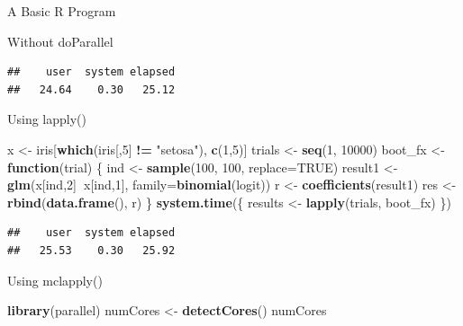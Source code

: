 \documentclass[ignorenonframetext,]{beamer}
\newenvironment{Shaded}{\begin{snugshade}}{\end{snugshade}}
\newcommand{\KeywordTok}[1]{\textcolor[rgb]{0.13,0.29,0.53}{\textbf{#1}}}
\newcommand{\DataTypeTok}[1]{\textcolor[rgb]{0.13,0.29,0.53}{#1}}
\newcommand{\DecValTok}[1]{\textcolor[rgb]{0.00,0.00,0.81}{#1}}
\newcommand{\StringTok}[1]{\textcolor[rgb]{0.31,0.60,0.02}{#1}}
\newcommand{\OtherTok}[1]{\textcolor[rgb]{0.56,0.35,0.01}{#1}}
\newcommand{\ControlFlowTok}[1]{\textcolor[rgb]{0.13,0.29,0.53}{\textbf{#1}}}
\newcommand{\OperatorTok}[1]{\textcolor[rgb]{0.81,0.36,0.00}{\textbf{#1}}}
\newcommand{\NormalTok}[1]{#1}
\begin{document}
\begin{frame}[fragile]{A Basic R Program}
\begin{block}{Without doParallel}
\begin{verbatim}
##    user  system elapsed 
##   24.64    0.30   25.12
\end{verbatim}

\end{block}

\begin{block}{Using lapply()}

\begin{Shaded}
\begin{Highlighting}[]
\NormalTok{x <-}\StringTok{ }\NormalTok{iris[}\KeywordTok{which}\NormalTok{(iris[,}\DecValTok{5}\NormalTok{] }\OperatorTok{!=}\StringTok{ "setosa"}\NormalTok{), }\KeywordTok{c}\NormalTok{(}\DecValTok{1}\NormalTok{,}\DecValTok{5}\NormalTok{)]}
\NormalTok{trials <-}\StringTok{ }\KeywordTok{seq}\NormalTok{(}\DecValTok{1}\NormalTok{, }\DecValTok{10000}\NormalTok{)}
\NormalTok{boot_fx <-}\StringTok{ }\ControlFlowTok{function}\NormalTok{(trial) \{}
\NormalTok{  ind <-}\StringTok{ }\KeywordTok{sample}\NormalTok{(}\DecValTok{100}\NormalTok{, }\DecValTok{100}\NormalTok{, }\DataTypeTok{replace=}\OtherTok{TRUE}\NormalTok{)}
\NormalTok{  result1 <-}\StringTok{ }\KeywordTok{glm}\NormalTok{(x[ind,}\DecValTok{2}\NormalTok{]}\OperatorTok{~}\NormalTok{x[ind,}\DecValTok{1}\NormalTok{], }\DataTypeTok{family=}\KeywordTok{binomial}\NormalTok{(logit))}
\NormalTok{  r <-}\StringTok{ }\KeywordTok{coefficients}\NormalTok{(result1)}
\NormalTok{  res <-}\StringTok{ }\KeywordTok{rbind}\NormalTok{(}\KeywordTok{data.frame}\NormalTok{(), r)}
\NormalTok{\}}
\KeywordTok{system.time}\NormalTok{(\{}
\NormalTok{  results <-}\StringTok{ }\KeywordTok{lapply}\NormalTok{(trials, boot_fx)}
\NormalTok{\})}
\end{Highlighting}
\end{Shaded}

\begin{verbatim}
##    user  system elapsed 
##   25.53    0.30   25.92
\end{verbatim}

\end{block}

\begin{block}{Using mclapply()}

\begin{Shaded}
\begin{Highlighting}[]
\KeywordTok{library}\NormalTok{(parallel)}
\NormalTok{numCores <-}\StringTok{ }\KeywordTok{detectCores}\NormalTok{()}
\NormalTok{numCores}
\end{Highlighting}
\end{Shaded}


\end{block}
\end{frame}
\end{document}
